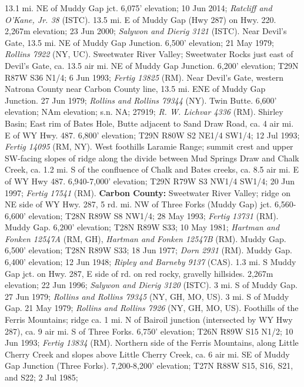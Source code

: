 13.1 mi. NE of Muddy Gap jct. 6,075' elevation; 10 Jun 2014;
\textit{Ratcliff and O'Kane, Jr. 38} (ISTC).
13.5 mi. E of Muddy Gap (Hwy 287) on Hwy. 220. 2,267m elevation; 23 Jun 2000;
\textit{Salywon and Dierig 3121} (ISTC).
Near Devil's Gate, 13.5 mi. NE of Muddy Gap Junction. 6,500' elevation;
21 May 1979; \textit{Rollins 7922} (NY, UC).
Sweetwater River Valley; Sweetwater Rocks just east of Devil's Gate, ca. 13.5
air mi. NE of Muddy Gap Junction. 6,200' elevation; T29N R87W S36 N1/4;
6 Jun 1993; \textit{Fertig 13825} (RM).
Near Devil's Gate, western Natrona County near Carbon County line, 13.5 mi. ENE
of Muddy Gap Junction. 27 Jun 1979; \textit{Rollins and Rollins 79344} (NY).
Twin Butte. 6,600' elevation; NAm elevation; s.n. NA; 27919;
\textit{R. W. Lichvar 4336} (RM).
Shirley Basin; East rim of Bates Hole, Butte adjacent to Sand Draw Road, ca. 4
air mi. E of WY Hwy. 487. 6,800' elevation; T29N R80W S2 NE1/4 SW1/4;
12 Jul 1993; \textit{Fertig 14095} (RM, NY).
West foothills Laramie Range; summit crest and upper SW-facing slopes of ridge
along the divide between Mud Springs Draw and Chalk Creek, ca. 1.2 mi. S of the
confluence of Chalk and Bates creeks, ca. 8.5 air mi. E of WY Hwy 487.
6,940-7,000' elevation; T29N R79W S3 NW1/4 SW1/4; 20 Jun 1997;
\textit{Fertig 17541} (RM).
  \textbf{Carbon County:}
Sweetwater River Valley; ridge on NE side of WY Hwy. 287, 5 rd. mi. NW of Three
Forks (Muddy Gap) jct. 6,560-6,600' elevation; T28N R89W S8 NW1/4; 28 May 1993;
\textit{Fertig 13731} (RM).
Muddy Gap. 6,200' elevation; T28N R89W S33; 10 May 1981;
\textit{Hartman and Fonken 12547A} (RM, GH),
\textit{Hartman and Fonken 12547B} (RM).
Muddy Gap. 6,500' elevation; T28N R89W S33; 18 Jun 1977;
\textit{Dorn 2931} (RM).
Muddy Gap. 6,400' elevation; 12 Jun 1948;
\textit{Ripley and Barneby 9137} (CAS).
1.3 mi. S Muddy Gap jct. on Hwy. 287, E side of rd. on red rocky, gravelly
hillsides. 2,267m elevation; 22 Jun 1996;
\textit{Salywon and Dierig 3120} (ISTC).
3 mi. S of Muddy Gap. 27 Jun 1979;
\textit{Rollins and Rollins 79345} (NY, GH, MO, US).
3 mi. S of Muddy Gap. 21 May 1979;
\textit{Rollins and Rollins 7926} (NY, GH, MO, US).
Foothills of the Ferris Mountains; ridge ca. 1 mi. N of Bairoil junction
(intersected by WY Hwy 287), ca. 9 air mi. S of Three Forks. 6,750' elevation;
T26N R89W S15 N1/2; 10 Jun 1993; \textit{Fertig 13834} (RM).
Northern side of the Ferris Mountains, along Little Cherry Creek and slopes
above Little Cherry Creek, ca. 6 air mi. SE of Muddy Gap Junction (Three Forks).
7,200-8,200' elevation; T27N R88W S15, S16, S21, and S22; 2 Jul 1985;
